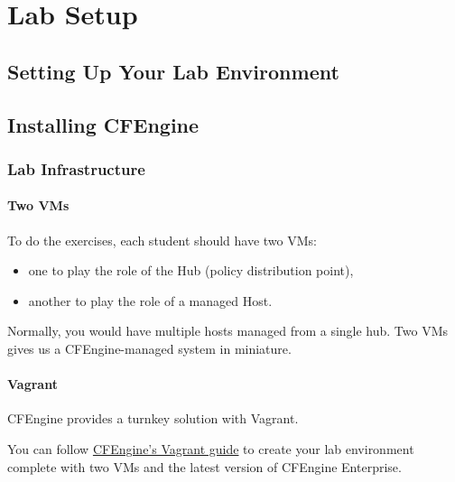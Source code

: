 



\chapter{Lab Setup}





\section{Setting Up Your Lab Environment}





\section{Installing CFEngine}





\subsection{Lab Infrastructure}

\subsubsection{Two VMs}

To do the exercises, each student should have two VMs:

\begin{itemize}
\item{} one to play the role of the Hub (policy distribution point),
\item{} another to play the role of a managed Host.
\end{itemize}

Normally, you would have multiple hosts managed from a single hub.
Two VMs gives us a CFEngine-managed system in miniature.





\subsubsection{Vagrant}

CFEngine provides a turnkey solution with Vagrant.

You can follow \href{https://docs.cfengine.com/latest/guide-installation-and-configuration-general-installation-installation-enterprise-vagrant.html}{CFEngine's Vagrant
guide}
to create your lab environment complete with two VMs and the latest
version of CFEngine Enterprise.

